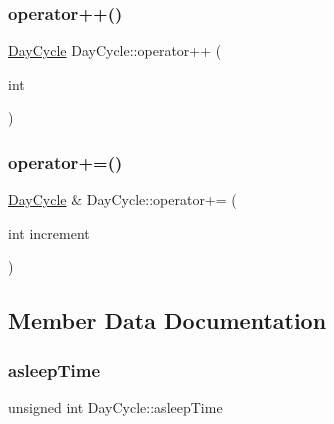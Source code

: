 \mbox{\label{classDayCycle_a50cc0f4f794586eeaf44dba56beb6880_a50cc0f4f794586eeaf44dba56beb6880}} 
\subsubsection{\texorpdfstring{operator++()}{operator++()}\hspace{0.1cm}{\footnotesize\ttfamily [2/2]}}
{\footnotesize\ttfamily \hyperlink{classDayCycle}{Day\+Cycle} Day\+Cycle\+::operator++ (\begin{DoxyParamCaption}\item[{int}]{ }\end{DoxyParamCaption})}

\mbox{\label{classDayCycle_ad4603ee10b8a03540cefaa39070a3c98_ad4603ee10b8a03540cefaa39070a3c98}} 
\subsubsection{\texorpdfstring{operator+=()}{operator+=()}}
{\footnotesize\ttfamily \hyperlink{classDayCycle}{Day\+Cycle} \& Day\+Cycle\+::operator+= (\begin{DoxyParamCaption}\item[{int}]{increment }\end{DoxyParamCaption})}



\subsection{Member Data Documentation}
\mbox{\label{classDayCycle_af544568ce6c2e04a2f04a76331a9ce05_af544568ce6c2e04a2f04a76331a9ce05}} 
\subsubsection{\texorpdfstring{asleep\+Time}{asleepTime}}
{\footnotesize\ttfamily unsigned int Day\+Cycle\+::asleep\+Time\hspace{0.3cm}{\ttfamily [private]}}

